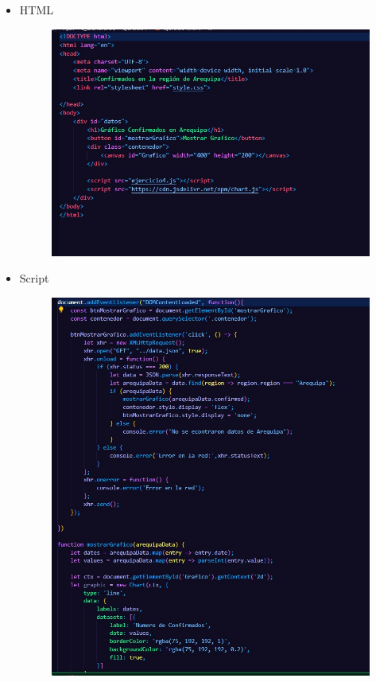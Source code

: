 \documentclass{article}
\begin{document}
	\begin{itemize}
		\item HTML
		\begin{figure}[H]
			\centering
			\includegraphics[width=1.0\textwidth,keepaspectratio]{img/Ejer4T2HTML.jpg}
		\end{figure}
		\item Script
		\begin{figure}[H]
			\centering
			\includegraphics[width=1.0\textwidth,keepaspectratio]{img/Ejer4T2Script.jpg}

\end{figure}
\end{itemize}
\end{document}
